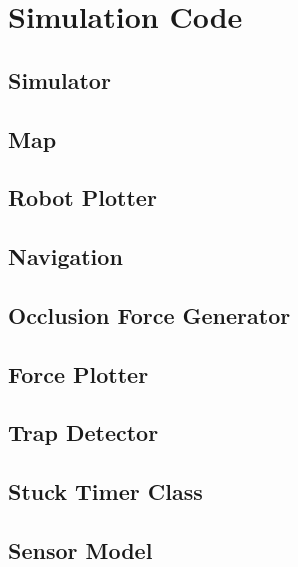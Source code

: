 \appendix

\chapter{Simulation Code}\label{chap:sim_code}

\section{Simulator}

\section{Map}

\section{Robot Plotter}


\section{Navigation}

\section{Occlusion Force Generator}

\section{Force Plotter}


\section{Trap Detector}

\section{Stuck Timer Class}


\section{Sensor Model}\label{sec:sensor_model}

